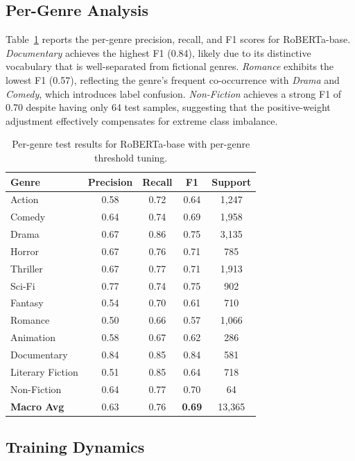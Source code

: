 \documentclass[11pt,a4paper]{article}
\begin{document}
\subsection{Per-Genre Analysis}

Table~\ref{tab:pergenre} reports the per-genre precision, recall, and F1 scores for RoBERTa-base. \textit{Documentary} achieves the highest F1 (0.84), likely due to its distinctive vocabulary that is well-separated from fictional genres. \textit{Romance} exhibits the lowest F1 (0.57), reflecting the genre's frequent co-occurrence with \textit{Drama} and \textit{Comedy}, which introduces label confusion. \textit{Non-Fiction} achieves a strong F1 of 0.70 despite having only 64 test samples, suggesting that the positive-weight adjustment effectively compensates for extreme class imbalance.

\begin{table}[H]
\centering
\caption{Per-genre test results for RoBERTa-base with per-genre threshold tuning.}
\label{tab:pergenre}
\begin{tabular}{lcccc}
\toprule
\textbf{Genre} & \textbf{Precision} & \textbf{Recall} & \textbf{F1} & \textbf{Support} \\
\midrule
Action            & 0.58 & 0.72 & 0.64 & 1,247 \\
Comedy            & 0.64 & 0.74 & 0.69 & 1,958 \\
Drama             & 0.67 & 0.86 & 0.75 & 3,135 \\
Horror            & 0.67 & 0.76 & 0.71 & 785 \\
Thriller          & 0.67 & 0.77 & 0.71 & 1,913 \\
Sci-Fi            & 0.77 & 0.74 & 0.75 & 902 \\
Fantasy           & 0.54 & 0.70 & 0.61 & 710 \\
Romance           & 0.50 & 0.66 & 0.57 & 1,066 \\
Animation         & 0.58 & 0.67 & 0.62 & 286 \\
Documentary       & 0.84 & 0.85 & 0.84 & 581 \\
Literary Fiction  & 0.51 & 0.85 & 0.64 & 718 \\
Non-Fiction       & 0.64 & 0.77 & 0.70 & 64 \\
\midrule
\textbf{Macro Avg}    & 0.63 & 0.76 & \textbf{0.69} & 13,365 \\
\bottomrule
\end{tabular}
\end{table}

\subsection{Training Dynamics}
\end{document}
